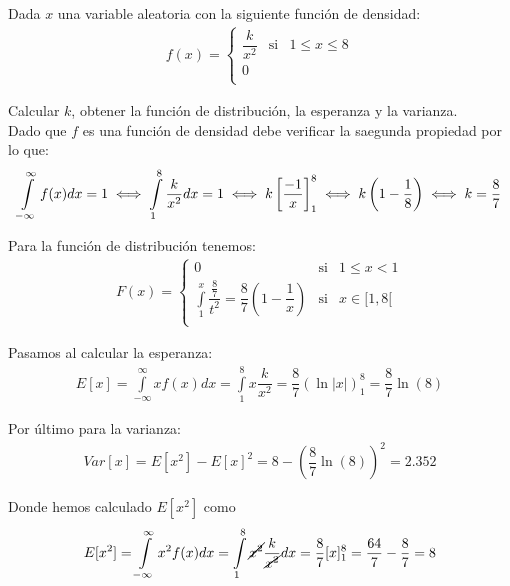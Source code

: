 \begin{ejercicio}[ puntos]
    Dada $x$ una variable aleatoria con la siguiente función de densidad:
    \begin{gather*}
        f(x) = \left\{
        \begin{array}{ccc}
            \dfrac{k}{x^2} & \text{si} & 1 \leq x \leq 8\\
            0 &&\\
        \end{array}
        \right.
    \end{gather*}

    Calcular $k$, obtener la función de distribución, la esperanza y la varianza.\\

    Dado que $f$ es una función de densidad debe verificar la saegunda propiedad por lo que:
    \begin{gather*}
        \int\limits_{-\infty}^{\infty} f(x) dx = 1 \iff \int\limits_{1}^{8} \frac{k}{x^2} dx = 1 \iff k \left[ \dfrac{-1}{x}\right]_ 1^8 \iff k \left(1 - \dfrac{1}{8}\right) \iff k = \dfrac{8}{7}
    \end{gather*}

    Para la función de distribución tenemos:
    \begin{gather*}
        F(x) = \left\{
            \begin{array}{ccc}
                0 & \text{si} & 1 \leq x < 1\\
                \int\limits_1^x \dfrac{\frac{8}{7}}{t^2} = \dfrac{8}{7} \left(1 - \dfrac{1}{x}\right) & \text{si}& x \in [1,8[\\
            \end{array}
            \right.
    \end{gather*}

    Pasamos al calcular la esperanza:
    \begin{gather*}
        E[x] = \int\limits_{-\infty}^{\infty} xf(x) dx = \int\limits_1^8 x\dfrac{k}{x^2} = \dfrac{8}{7}(\ln|x|)_1^8 = \dfrac{8}{7}\ln(8)
    \end{gather*}

    Por último para la varianza:
    \begin{gather*}
        Var[x] = E[x^2]- E[x]^2 = 8 - \left(\dfrac{8}{7}\ln(8)\right)^2 = 2.352
    \end{gather*}

    Donde hemos calculado $E[x^2]$ como
    \begin{gather*}
        E[x^2] = \int\limits_{-\infty}^{\infty} x^2 f(x) dx = \int\limits_1^8 \cancel{x^2} \frac{k}{\cancel{x^2}} dx = \frac{8}{7}[x]_1^8 = \frac{64}{7} - \frac{8}{7} = 8
    \end{gather*}
\end{ejercicio}

